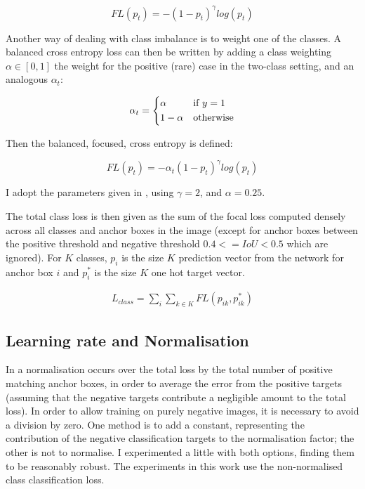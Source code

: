 \begin{equation}
FL(p_t) = - (1 - p_t)^\gamma log(p_t)
\label{eq:focal_loss_p}
\end{equation}

Another way of dealing with class imbalance is to weight one of the classes. A balanced cross entropy loss can then be written by adding a class weighting $\alpha \in \left[0, 1\right]$ the weight for the positive (rare) case in the two-class setting, and an analogous $\alpha_t$:

\begin{equation}
\alpha_t = 
  \begin{cases*}
  \alpha & if $y = 1$\\
  1 - \alpha & otherwise\\
  \end{cases*}
\label{eq:balanced_weight}
\end{equation}

Then the balanced, focused, cross entropy is defined:

\begin{equation}
FL(p_t) = -\alpha_t (1 - p_t)^\gamma log(p_t)
\label{eq:focal_loss}
\end{equation}

I adopt the parameters given in \cite{Lin2017}, using $ \gamma = 2 $, and $ \alpha = 0.25 $. 

The total class loss is then given as the sum of the focal loss computed densely across all classes and anchor boxes in the image (except for anchor boxes between the positive threshold and negative threshold $0.4 <= IoU < 0.5$ which are ignored). For $K$ classes, $p_i$ is the size $K$ prediction vector from the network for anchor box $i$ and $p^*_i$ is the size $K$ one hot target vector.

\begin{equation}
\begin{split}
L_{class} = \sum_i{\sum_{k \in K}FL(p_{ik}, p^*_{ik})}
\end{split}
\label{eq:class_loss}
\end{equation}

\subsection {Learning rate and Normalisation}

In \cite{Lin2017} a normalisation occurs over the total loss by the total number of positive matching anchor boxes, in order to average the error from the positive targets (assuming that the negative targets contribute a negligible amount to the total loss). In order to allow training on purely negative images, it is necessary to avoid a division by zero. One method is to add a constant, representing the contribution of the negative classification targets to the normalisation factor;  the other is not to normalise. I experimented a little with both options, finding them to be reasonably robust. The experiments in this work use the non-normalised class classification loss.

